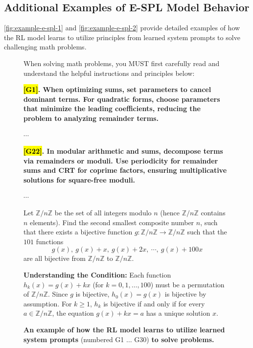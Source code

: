 \documentclass{article}
\theoremstyle{plain}
\theoremstyle{definition}
\theoremstyle{remark}
\begin{document}
\subsection{Additional Examples of E-SPL Model Behavior}

\autoref{fig:example-e-spl-1} and \autoref{fig:example-e-spl-2} provide detailed examples of how the RL model learns to utilize principles from learned system prompts to solve challenging math problems.

\begin{figure}[!tb]
\centering
\caption{\textbf{An example of how the RL model learns to utilize learned system prompts} (numbered G1 $\dots$ G30) \textbf{to solve problems.}}

\begin{runcard}[title={Example of How E-SPL Shapes Model Behavior}]

\medskip

\begin{runbox}[title={\textbf{Learned System Prompt}}]
When solving math problems, you MUST first carefully read and understand the helpful instructions and principles below:

\textbf{\color{Brown}\hl{{[G1]}}. When optimizing sums, set parameters to cancel dominant terms. For quadratic forms, choose parameters that minimize the leading coefficients, reducing the problem to analyzing remainder terms.}

$\cdots$

\textbf{\color{Brown}\hl{{[G22]}}. In modular arithmetic and sums, decompose terms via remainders or moduli. Use periodicity for remainder sums and CRT for coprime factors, ensuring multiplicative solutions for square-free moduli.}

$\cdots$
\end{runbox}

\begin{runbox}[title={Problem}]
Let \(\mathbb{Z}/n\mathbb{Z}\) be the set of all integers modulo \(n\) (hence \(\mathbb{Z}/n\mathbb{Z}\) contains \(n\) elements). Find the second smallest composite number \(n\), such that there exists a bijective function \(g:\mathbb{Z}/n\mathbb{Z}\to \mathbb{Z}/n\mathbb{Z}\) such that the \(101\) functions
\[ g(x),\ g(x)+x,\ g(x)+2x,\ \cdots,\ g(x)+100x \]
are all bijective from \(\mathbb{Z}/n\mathbb{Z}\) to \(\mathbb{Z}/n\mathbb{Z}\).
\end{runbox}

\begin{runbox}[title={Model Output}]
\textbf{Understanding the Condition:}
Each function \(h_k(x) = g(x) + kx\) (for \(k=0,1,\ldots,100\)) must be a permutation of \(\mathbb{Z}/n\mathbb{Z}\). Since \(g\) is bijective, \(h_0(x)=g(x)\) is bijective by assumption. For \(k \geq 1\), \(h_k\) is bijective if and only if for every \(a \in \mathbb{Z}/n\mathbb{Z}\), the equation \(g(x) + kx = a\) has a unique solution \(x\).


\end{runbox}
\end{runcard}
\end{figure}
\end{document}
